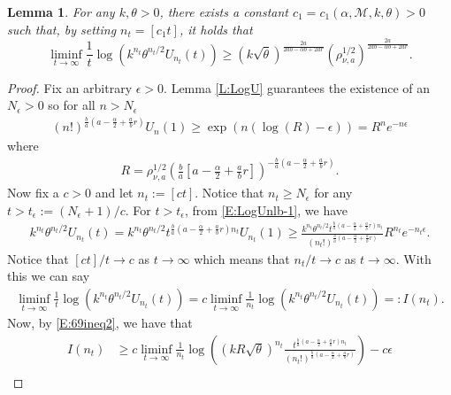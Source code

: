 \documentclass[12pt]{report}
\theoremstyle{plain}
\newtheorem{lemma}[theorem]{Lemma}
\theoremstyle{definition}
\numberwithin{equation}{section}
\begin{document}
\begin{lemma} \label{L:logUnlb}
	For any $k,\theta >0$, there exists a constant $c_1 = c_1(\alpha,\mathcal{M}, k, \theta) >0$ such
	that, by setting $n_t = [c_1 t]$, it holds that
	\begin{equation}\label{E:69ineq}
	\liminf_{t \to \infty} \frac{1}{t} \log( k^{n_t} \theta^{n_t/2}U_{n_t}(t)) \ge
	\left( k \sqrt{\theta} \right)^{\frac{2a}{2ab-\alpha b + 2ar}} \left( \rho_{\nu,a}^{1/2} \right)^{\frac{2a}{2ab-\alpha b + 2ar}}.
	\end{equation}
\end{lemma}
\begin{proof}
	Fix an arbitrary $\epsilon > 0$. Lemma \ref{L:LogU} guarantees the existence of an $N_\epsilon >0$
	so for all $n>N_\epsilon$
	\begin{align} \label{E:LogUnlb-1}
	(n!)^{\frac{b}{a}\left( a - \frac{\alpha}{2} + \frac{a}{b}r \right)} U_n(1) \ge \exp\left( n(\log(R)-\epsilon) \right) = R^n e^{-n\epsilon }
	\end{align}
	where
	\begin{align*}
	R = \rho_{\nu,a}^{1/2}  \left( \frac{b}{a}\left[ a - \frac{\alpha}{2} + \frac{a}{b}r \right ] \right)^{- \frac{b}{a}\left( a - \frac{\alpha}{2} + \frac{a}{b}r \right) }.
	\end{align*}
	Now fix a $c>0$ and let $n_t := [ct]$. Notice that $n_t \ge N_\epsilon$ for any $t>t_\epsilon :=
	(N_\epsilon +1)/c$.  For $t > t_\epsilon$, from \eqref{E:LogUnlb-1}, we have
	\begin{align} \label{E:69ineq2}
	k^{n_t}\theta^{n_t/2}U_{n_t}(t)
	=   k^{n_t} \theta^{n_t/2} t^{\frac{b}{a} \left( a-\frac{\alpha}{2} + \frac{a}{b}r \right)n_t } U_{n_t}(1)
	\ge \frac{ k^{n_t} \theta^{n_t/2} t^{\frac{b}{a} \left( a-\frac{\alpha}{2} + \frac{a}{b}r \right)n_t } }{ (n_t!)^{\frac{b}{a} \left(a-\frac{\alpha}{2} +\frac{a}{b}r \right)} } R^{n_t}e^{-n_t \epsilon}.
	\end{align}
	Notice that $[ct]/t \to c$ as $t \to \infty$ which means that $n_t/t \to c$ as $t \to \infty$.
	With this we can say
	\begin{align*}
	\liminf_{t \to \infty} \frac{1}{t} \log \left( k^{n_t} \theta^{n_t/2} U_{n_t}(t) \right)
	= c \liminf_{t\to \infty} \frac{1}{n_t} \log \left( k^{n_t} \theta^{n_t/2} U_{n_t}(t) \right)
	= : I(n_t).
	\end{align*}
	Now, by \eqref{E:69ineq2}, we have that
	\begin{align*}
	I(n_t) & \ge c \liminf_{t\to \infty} \frac{1}{n_t} \log \left( (kR\sqrt{\theta})^{n_t} \frac{ t^{\frac{b}{a} \left( a-\frac{\alpha}{2} + \frac{a}{b}r \right)n_t } }{ (n_t!)^{\frac{b}{a}\left( a -\frac{\alpha}{2} + \frac{a}{b}r \right) }  }\right) - c\epsilon                                                                                                  \\

\end{align*}
\end{proof}
\end{document}
